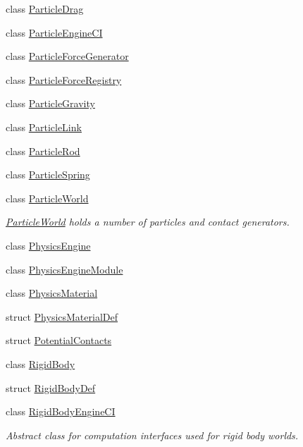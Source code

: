 \begin{DoxyCompactItemize}
\item 
class \mbox{\hyperlink{classr3_1_1_particle_drag}{Particle\+Drag}}
\item 
class \mbox{\hyperlink{classr3_1_1_particle_engine_c_i}{Particle\+Engine\+CI}}
\item 
class \mbox{\hyperlink{classr3_1_1_particle_force_generator}{Particle\+Force\+Generator}}
\item 
class \mbox{\hyperlink{classr3_1_1_particle_force_registry}{Particle\+Force\+Registry}}
\item 
class \mbox{\hyperlink{classr3_1_1_particle_gravity}{Particle\+Gravity}}
\item 
class \mbox{\hyperlink{classr3_1_1_particle_link}{Particle\+Link}}
\item 
class \mbox{\hyperlink{classr3_1_1_particle_rod}{Particle\+Rod}}
\item 
class \mbox{\hyperlink{classr3_1_1_particle_spring}{Particle\+Spring}}
\item 
class \mbox{\hyperlink{classr3_1_1_particle_world}{Particle\+World}}
\begin{DoxyCompactList}\small\item\em \mbox{\hyperlink{classr3_1_1_particle_world}{Particle\+World}} holds a number of particles and contact generators. \end{DoxyCompactList}\item 
class \mbox{\hyperlink{classr3_1_1_physics_engine}{Physics\+Engine}}
\item 
class \mbox{\hyperlink{classr3_1_1_physics_engine_module}{Physics\+Engine\+Module}}
\item 
class \mbox{\hyperlink{classr3_1_1_physics_material}{Physics\+Material}}
\item 
struct \mbox{\hyperlink{structr3_1_1_physics_material_def}{Physics\+Material\+Def}}
\item 
struct \mbox{\hyperlink{structr3_1_1_potential_contacts}{Potential\+Contacts}}
\item 
class \mbox{\hyperlink{classr3_1_1_rigid_body}{Rigid\+Body}}
\item 
struct \mbox{\hyperlink{structr3_1_1_rigid_body_def}{Rigid\+Body\+Def}}
\item 
class \mbox{\hyperlink{classr3_1_1_rigid_body_engine_c_i}{Rigid\+Body\+Engine\+CI}}
\begin{DoxyCompactList}\small\item\em Abstract class for computation interfaces used for rigid body worlds. \end{DoxyCompactList}\item 

\end{DoxyCompactItemize}
